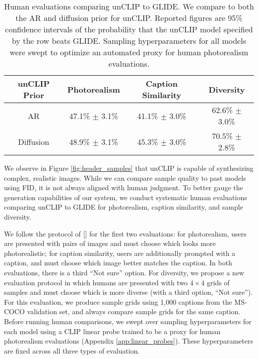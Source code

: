 \documentclass{article}
\newcommand{\namecite}[1]{\citeauthor{#1} [\citenum{#1}]}
\newcommand{\modelname}{unCLIP}
\begin{document}
\begin{table}[t]
    \begin{center}
    \begin{tabular}{cccc}
    \toprule
    unCLIP Prior & Photorealism & Caption Similarity & Diversity \\
    \midrule
    AR & 47.1\% $\pm$ 3.1\% & 41.1\% $\pm$ 3.0\% & 62.6\% $\pm$ 3.0\% \\
    Diffusion & 48.9\% $\pm$ 3.1\% & 45.3\% $\pm$ 3.0\% & 70.5\% $\pm$ 2.8\% \\
    \bottomrule
    \end{tabular}
    \end{center}
    \caption{\label{tab:humaneval_realism} Human evaluations comparing \modelname{} to GLIDE. We compare to both the AR and diffusion prior for \modelname{}. Reported figures are 95\% confidence intervals of the probability that the \modelname{} model specified by the row beats GLIDE. Sampling hyperparameters for all models were swept to optimize an automated proxy for human photorealism evaluations.}
    \vskip -0.2in
\end{table}

We observe in Figure \ref{fig:header_samples} that \modelname{} is capable of synthesizing complex, realistic images. While we can compare sample quality to past models using FID, it is not always aligned with human judgment. To better gauge the generation capabilities of our system, we conduct systematic human evaluations comparing \modelname{} to GLIDE for photorealism, caption similarity, and sample diversity. 

We follow the protocol of \namecite{dalle,glide} for the first two evaluations: for photorealism, users are presented with pairs of images and must choose which looks more photorealistic; for caption similarity, users are additionally prompted with a caption, and must choose which image better matches the caption. In both evaluations, there is a third ``Not sure'' option. For diversity, we propose a new evaluation protocol in which humans are presented with two $4 \times 4$ grids of samples and must choose which is more diverse (with a third option, ``Not sure''). For this evaluation, we produce sample grids using 1,000 captions from the MS-COCO validation set, and always compare sample grids for the same caption. Before running human comparisons, we swept over sampling hyperparameters for each model using a CLIP linear probe trained to be a proxy for human photorealism evaluations (Appendix \ref{app:linear_probes}). These hyperparameters are fixed across all three types of evaluation.
\end{document}
